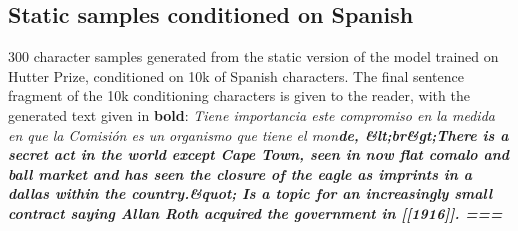 \documentclass{article}
\begin{document}
\subsection{Static samples conditioned on Spanish}
300 character samples generated from the static version of the model trained on Hutter Prize, conditioned on 10k of Spanish characters. The final sentence fragment of the 10k conditioning characters is given to the reader, with the generated text given in \textbf{bold}:
\newline
\newline
\newline
\textsl{
Tiene importancia este compromiso en la medida en que la Comisión es un organismo que tiene el mon\textbf{de,
\newline
\&lt;br\&gt;There is a secret act in the world except Cape Town, seen in now flat comalo and ball market and has seen the closure of the eagle as imprints in a dallas within the country.\&quot; Is a topic for an increasingly small contract saying Allan Roth acquired the government in {[}{[}1916{]}{]}.
\newline
\newline
===
}
}
\end{document}
